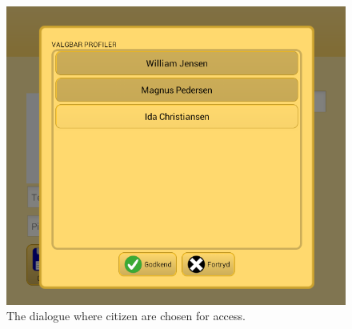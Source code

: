 \begin{figure}[h]
\includegraphics[scale=0.5]{media/sprint4/save_dialog3}
\caption{The dialogue where citizen are chosen for access.}
\label{fig:save_dialogue3}
\end{figure}
